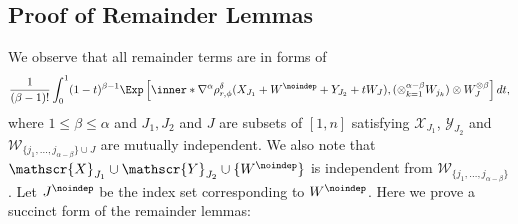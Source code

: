 \documentclass[aos]{imsart}
\begin{document}
\begin{appendix}

\subsection{Proof of Remainder Lemmas} \label{sec:pf_remainder_lemma}

We observe that all remainder terms are in forms of 
\begin{equation*}
\begin{aligned}
    \frac{1}{(\beta-1)!} \int_0^1 (1-t)^{\beta-1} \Exp\left[
        \inner*{\nabla^\alpha \rho_{r,\phi}^\delta(X_{J_1} + W^\noindep + Y_{J_2} + t W_J), (\otimes_{k=1}^{\alpha-\beta} W_{j_k}) \otimes W_J^{\otimes \beta}} 
    \right] dt,
\end{aligned}
\end{equation*}
where $1 \leq \beta \leq \alpha$ and $J_1, J_2$ and $J$ are subsets of $[1,n]$ satisfying $\mathscr{X}_{J_1}$, $\mathscr{Y}_{J_2}$ and $\mathscr{W}_{\{j_1,\dots,j_{\alpha-\beta}\} \cup J}$ are mutually independent. We also note that $\mathscr{X}_{J_1} \cup \mathscr{Y}_{J_2} \cup \{W^\noindep\}$ is independent from $\mathscr{W}_{\{j_1,\dots,j_{\alpha-\beta}\}}$. Let $J^{\noindep}$ be the index set corresponding to $W^\noindep$. Here we prove a succinct form of the remainder lemmas:


\end{appendix}
\end{document}

